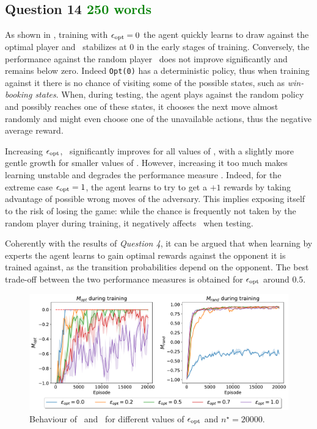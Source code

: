 \documentclass[10pt]{IEEEtran}
\begin{document}
\subsection*{Question 14 \textcolor{Green}{250 words}}
As shown in , training with $\epsilon_{\text{opt}} = 0$ the agent quickly learns to draw against the optimal player and \mopt \ stabilizes at $0$ in the early stages of training. Conversely, the performance against the random player \mrand\  does not improve significantly and remains below zero. Indeed \texttt{Opt(0)} has a deterministic policy, thus when training against it there is no chance of visiting some of the possible states, such as \emph{win-booking states}. When, during testing, the agent plays against the random policy and possibly reaches one of these states, it chooses the next move almost randomly and might even choose one of the unavailable actions, thus the negative average reward. 

Increasing $\epsilon_{\text{opt}}$, \mrand\ significantly improves for all values of \eopt, with a slightly more gentle growth for smaller values of \eopt. However, increasing it too much makes learning unstable and degrades the performance measure \mopt. Indeed, for the extreme case $\epsilon_{\text{opt}} = 1$, the agent learns to try to get a $+1$ rewards by taking advantage of possible wrong moves of the adversary. This implies exposing itself to the risk of losing the game: while the chance is frequently not taken by the random player during training, it negatively affects \mopt\ when testing. 

Coherently with the results of \emph{Question 4}, it can be argued that when learning by experts the agent learns to gain optimal rewards against the opponent it is trained against, as the transition probabilities depend on the opponent. The best trade-off between the two performance measures is obtained for $\epsilon_{\text{opt}}$ around $0.5$. 
\begin{figure}[h]
    \centering
    \includegraphics[width = \linewidth]{code/figures/performance_dqn_epsilon_opt_experts.pdf}
    \caption{Behaviour of \mopt\  and \mrand\ for different values of $\epsilon_{\text{opt}}$ and $n^{\star} = 20000$.}
    \label{plot_question14}
\end{figure}
\end{document}
